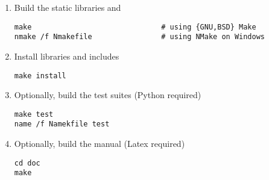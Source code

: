\begin{enumerate}
\item Build the static libraries  and 
\begin{lstlisting}
make                              # using {GNU,BSD} Make
nmake /f Nmakefile                # using NMake on Windows
\end{lstlisting}
\item Install libraries and includes
\begin{lstlisting}
make install 
\end{lstlisting}
\item Optionally, build the test suites (Python required)
\begin{lstlisting}
make test
name /f Namekfile test
\end{lstlisting}
\item Optionally, build the manual (Latex required)
\begin{lstlisting}
cd doc
make
\end{lstlisting}
\end{enumerate}

